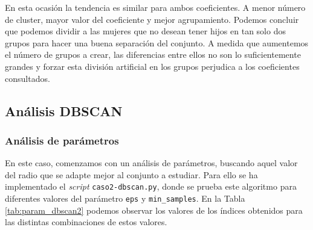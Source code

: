 \documentclass[a4paper, 20pt]{article}
\begin{document}
En esta ocasión la tendencia es similar para ambos coeficientes. A menor número de cluster, mayor valor del coeficiente y mejor agrupamiento. Podemos concluir que podemos dividir a las mujeres que no desean tener hijos en tan solo dos grupos para hacer una buena separación del conjunto. A medida que aumentemos el número de grupos a crear, las diferencias entre ellos no son lo suficientemente grandes y forzar esta división artificial en los grupos perjudica a los coeficientes consultados.

\subsection{Análisis DBSCAN}
\subsubsection{Análisis de parámetros}
En este caso, comenzamos con un análisis de parámetros, buscando aquel valor del radio que se adapte mejor al conjunto a estudiar. Para ello se ha implementado el \textit{script} \texttt{caso2-dbscan.py}, donde se prueba este algoritmo para diferentes valores del parámetro \texttt{eps} y \texttt{min\_samples}. En la Tabla \ref{tab:param_dbscan2} podemos observar los valores de los índices obtenidos para las distintas combinaciones de estos valores.
\end{document}
